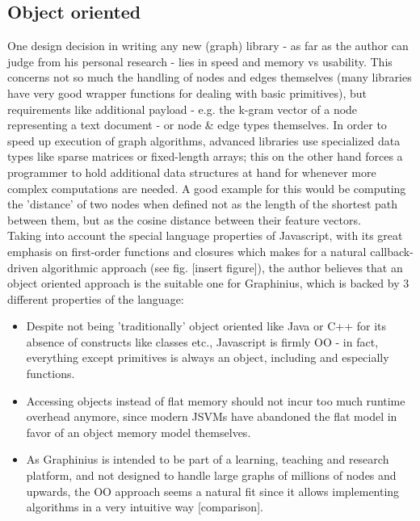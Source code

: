 	\subsection{Object oriented}
	\label{ssect:oo}
	One design decision in writing any new (graph) library - as far as the author can judge from his personal research - lies in speed and memory vs usability. This concerns not so much the handling of nodes and edges themselves (many libraries have very good wrapper functions for dealing with basic primitives), but requirements like additional payload - e.g. the k-gram vector of a node representing a text document - or node \& edge types themselves. In order to speed up execution of graph algorithms, advanced libraries use specialized data types like sparse matrices or fixed-length arrays; this on the other hand forces a programmer to hold additional data structures at hand for whenever more complex computations are needed. A good example for this would be computing the 'distance' of two nodes when defined not as the length of the shortest path between them, but as the cosine distance between their feature vectors. \\
	
	Taking into account the special language properties of Javascript, with its great emphasis on first-order functions and closures which makes for a natural callback-driven algorithmic approach (see fig. [insert figure]), the author believes that an object oriented approach is the suitable one for Graphinius, which is backed by 3 different properties of the language:
	
	\begin{itemize}
		\item Despite not being 'traditionally' object oriented like Java or C++ for its absence of constructs like classes etc., Javascript is firmly OO - in fact, everything except primitives is always an object, including and especially functions.
		\item Accessing objects instead of flat memory should not incur too much runtime overhead anymore, since modern JSVMs have abandoned the flat model in favor of an object memory model themselves.
		\item As Graphinius is intended to be part of a learning, teaching and research platform, and not designed to handle large graphs of millions of nodes and upwards, the OO approach seems a natural fit since it allows implementing algorithms in a very intuitive way [comparison].
	\end{itemize}




